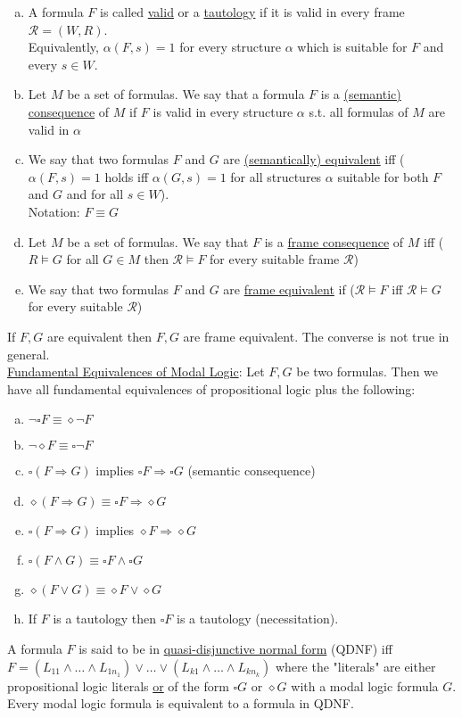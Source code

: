 \documentclass[a4paper]{article}
\newcommand{\ul}{\underline}
\begin{document}
\begin{enumerate}[(a)]
	\item A formula $F$ is called \ul{valid} or a \ul{tautology} if it is valid in every frame $\mathcal{R}=(W,R)$.\\
	Equivalently, $\alpha(F,s)=1$ for every structure $\alpha$ which is suitable for $F$ and every $s\in W$.
	\item Let $M$ be a set of formulas. We say that a formula $F$ is a \ul{(semantic) consequence} of $M$ if $F$ is valid in every structure $\alpha$ s.t. all formulas of $M$ are valid in $\alpha$
	\item We say that two formulas $F$ and $G$ are \ul{(semantically) equivalent} iff ($\alpha(F,s)=1$ holds iff $\alpha(G,s)=1$ for all structures $\alpha$ suitable for both $F$ and $G$ and for all $s\in W$).\\
	Notation: $F\equiv G$
	\item Let $M$ be a set of formulas. We say that $F$ is a \ul{frame consequence} of $M$ iff ($R\vDash G$ for all $G\in M$ then $\mathcal{R}\vDash F$ for every suitable frame $\mathcal{R}$)
	\item We say that two formulas $F$ and $G$ are \ul{frame equivalent} if ($\mathcal{R}\vDash F$ iff $\mathcal{R}\vDash G$ for every suitable $\mathcal{R}$)
\end{enumerate}
If $F,G$ are equivalent then $F,G$ are frame equivalent. The converse is not true in general.\\
\ul{Fundamental Equivalences of Modal Logic}: Let $F,G$ be two formulas. Then we have all fundamental equivalences of propositional logic plus the following:
\begin{enumerate}[(a)]
	\item $\neg\square F\equiv \diamond\neg F$
	\item $\neg\diamond F\equiv \square\neg F$
	\item $\square(F\Rightarrow G)$ implies $\square F\Rightarrow\square G$ (semantic consequence)
	\item $\diamond(F\Rightarrow G)\equiv \square F\Rightarrow\diamond G$
	\item $\square(F\Rightarrow G)$ implies $\diamond F\Rightarrow\diamond G$
	\item $\square (F\wedge G)\equiv \square F\wedge \square G$
	\item $\diamond (F\vee G)\equiv \diamond F\vee \diamond G$
	\item If $F$ is a tautology then $\square F$ is a tautology (necessitation).
\end{enumerate}
A formula $F$ is said to be in \ul{quasi-disjunctive normal form} (QDNF) iff $F=(L_{11}\wedge\dots\wedge L_{1n_1})\vee\dots\vee(L_{k1}\wedge\dots\wedge L_{kn_k})$ where the "literals" are either propositional logic literals \ul{or} of the form $\square G$ or $\diamond G$ with a modal logic formula $G$.\\
Every modal logic formula is equivalent to a formula in QDNF.\\
\end{document}
